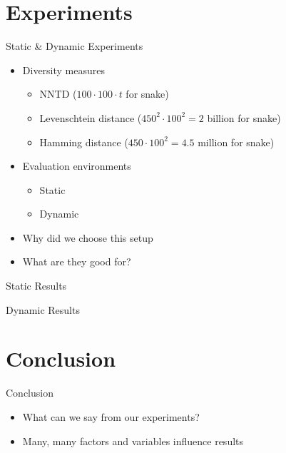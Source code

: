 \section{Experiments}
\begin{frame}{Static \& Dynamic Experiments}
  \begin{itemize}
    \item Diversity measures
      \begin{itemize}
        \item NNTD ($100 \cdot 100 \cdot t$ for snake)
        \item Levenschtein distance ($450^2 \cdot 100^2 = 2$ billion for snake)
        \item Hamming distance ($450 \cdot 100^2 = 4.5$ million for snake) %
      \end{itemize}
    \item Evaluation environments
      \begin{itemize}
        \item Static
        \item Dynamic
      \end{itemize}
    \item Why did we choose this setup
    \item What are they good for?
  \end{itemize}
\end{frame}

\begin{frame}{Static Results}
  
\end{frame}

\begin{frame}{Dynamic Results}
  
\end{frame}

\section{Conclusion}
\begin{frame}{Conclusion}
  \begin{itemize}
    \item What can we say from our experiments?
    \item Many, many factors and variables influence results
  \end{itemize}
\end{frame}

